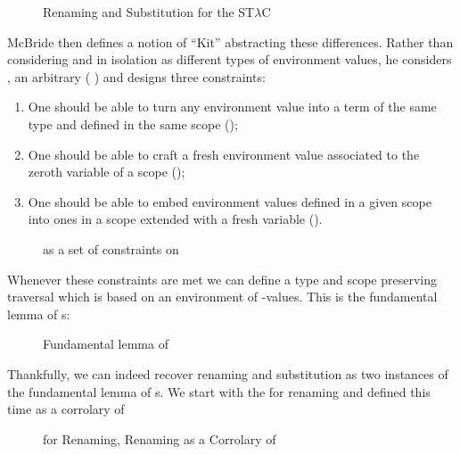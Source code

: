 \begin{figure}[h]
\caption{Renaming\label{ren} and Substitution\label{sub} for the ST$λ$C}
\end{figure}

McBride then defines a notion of ``Kit'' abstracting these differences.
Rather than considering  and  in isolation as different
types of environment values, he considers , an arbitrary
( ) and designs three constraints:

\begin{enumerate}
  \item
    One should be able to turn any environment value into a term of
    the same type and defined in the same scope ();
  \item
    One should be able to craft a fresh environment value associated
    to the zeroth variable of a scope ();
  \item
    One should be able to embed environment values defined in a given
    scope into ones in a scope extended with a fresh variable ().
\end{enumerate}

\begin{figure}[h]
\caption{ as a set of constraints on }
\end{figure}

Whenever these constraints are met we can define a type and scope preserving
traversal which is based on an environment of -values. This is the
fundamental lemma of s:

\begin{figure}[h]
\caption{Fundamental lemma of }
\end{figure}

Thankfully, we can indeed recover renaming and substitution as two instances of
the fundamental lemma of s. We start with the  for renaming
and  defined this time as a corrolary of 

\begin{figure}[h]
\begin{minipage}{0.35\textwidth}
\end{minipage}
\begin{minipage}{0.65\textwidth}
\end{minipage}
\caption{ for Renaming, Renaming as a Corrolary of \label{fig:renkit}}
\end{figure}

